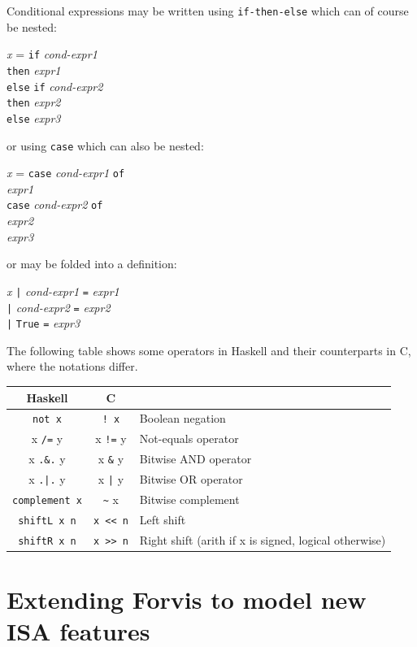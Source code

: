 \documentclass[11pt]{article}
\newcommand{\hmm}{\hspace*{2em}}
\newcommand{\hmmm}{\hspace*{3em}}
\begin{document}
Conditional expressions may be written using \verb|if-then-else| which can of course be nested:
\begin{tabbing}
\hmmm \= \emph{x} = \= {\tt if} \emph{cond-expr1} \\
      \>            \> {\tt then} \emph{expr1} \\
      \>            \> {\tt else} \= {\tt if} \emph{cond-expr2} \\
      \>            \>            \> {\tt then} \emph{expr2} \\
      \>            \>            \> {\tt else} \emph{expr3}
\end{tabbing}
or using \verb|case| which can also be nested:
\begin{tabbing}
\hmmm \= \emph{x} = \= {\tt case} \emph{cond-expr1} {\tt of}\\
      \>            \> \hmm {\tt True -> } \emph{expr1} \\
      \>            \> \hmm {\tt False ->} \= {\tt case} \emph{cond-expr2} {\tt of}\\
      \>            \>                     \> \hmm {\tt True ->} \emph{expr2} \\
      \>            \>                     \> \hmm {\tt False ->} \emph{expr3}
\end{tabbing}
or may be folded into a definition:
\begin{tabbing}
\hmmm \= \emph{x} \= {\tt |} \emph{cond-expr1} \= {\tt =} \emph{expr1} \\
      \>          \> {\tt |} \emph{cond-expr2} \> {\tt =} \emph{expr2} \\
      \>          \> {\tt |} {\tt True}        \> {\tt =} \emph{expr3}
\end{tabbing}

The following table shows some operators in Haskell and their
counterparts in C, where the notations differ.

\begin{tabular}{|c|c|l|}
\hline
Haskell           & C             & \\
\hline
\verb|not x|        & \verb|! x|    & Boolean negation \\
x \verb|/=| y       & x \verb|!=| y & Not-equals operator \\
x \verb|.&.| y      & x \verb|&| y  & Bitwise AND operator \\
x \verb/.|./ y      & x \verb/|/ y  & Bitwise OR operator \\
\verb|complement x| & \verb|~| x    & Bitwise complement \\
\verb|shiftL x n|   & \verb|x << n| & Left shift  \\
\verb|shiftR x n|   & \verb|x >> n| & Right shift (arith if x is signed, logical otherwise) \\
\hline
\end{tabular}


\newpage

\section{Extending Forvis to model new ISA features}

\label{sec_extending_forvis}

\end{document}
